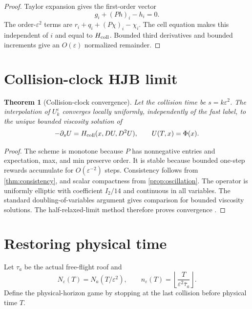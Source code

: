 \documentclass[11pt,reqno]{amsart}
\newtheorem{theorem}{Theorem}[section]
\theoremstyle{definition}
\theoremstyle{remark}
\begin{document}
\begin{proof}
Taylor expansion gives the first-order vector
\[
 g_i+(Ph)_i-h_i=0.
\]
The order-$\varepsilon^2$ terms are $r_i+q_i+(P\chi)_i-\chi_i$.
The cell equation makes this independent of $i$ and equal to
$H_{\rm coll}$.  Bounded third derivatives and bounded increments give an
$O(\varepsilon)$ normalized remainder.
\end{proof}

\section{Collision-clock HJB limit}\label{sec:hjb}

\begin{theorem}[Collision-clock convergence]\label{thm:collision-hjb}
Let the collision time be $s=k\varepsilon^2$.  The interpolation of
$U_k^\varepsilon$ converges locally uniformly, independently of the fast
label, to the unique bounded viscosity solution of
\begin{equation}\label{eq:collision-pde}
 -\partial_sU
 =
 H_{\rm coll}(x,DU,D^2U),
 \qquad U(T,x)=\Phi(x).
\end{equation}
\end{theorem}

\begin{proof}
The scheme is monotone because $P$ has nonnegative entries and expectation,
max, and min preserve order.  It is stable because bounded one-step rewards
accumulate for $O(\varepsilon^{-2})$ steps.  Consistency follows from
\cref{thm:consistency}, and scalar compactness from
\cref{prop:oscillation}.  The operator is uniformly elliptic with coefficient
$I_2/14$ and continuous in all variables.  The standard
doubling-of-variables argument gives comparison for bounded viscosity
solutions.  The half-relaxed-limit method therefore proves convergence
\cite{BarlesSouganidis1991,CrandallIshiiLions1992}.
\end{proof}

\section{Restoring physical time}\label{sec:physical}

Let $\tau_a$ be the actual free-flight roof and
\[
 N_\varepsilon(T)
 =
 N_a(T/\varepsilon^2),\qquad
 n_\varepsilon(T)
 =
 \left\lfloor\frac{T}{\varepsilon^2\bar\tau_a}\right\rfloor.
\]
Define the physical-horizon game by stopping at the last collision before
physical time $T$.
\end{document}
